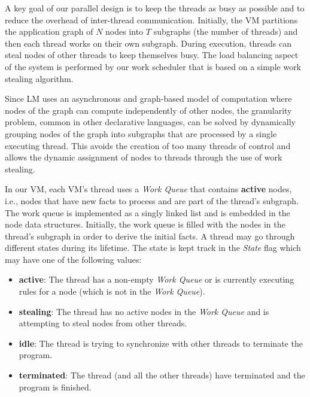 A key goal of our parallel design is to keep the threads as busy as possible and
to reduce the overhead of inter-thread communication. Initially, the VM
partitions the application graph of $N$ nodes into $T$ subgraphs (the number of
threads) and then each thread works on their own subgraph. During execution,
threads can steal nodes of other threads to keep themselves busy. The load
balancing aspect of the system is performed by our work scheduler that is based
on a simple work stealing algorithm.

Since LM uses an asynchronous and graph-based model of computation where nodes
of the graph can compute independently of other nodes, the granularity problem,
common in other declarative languages, can be solved by dynamically grouping
nodes of the graph into subgraphs that are processed by a single executing
thread. This avoids the creation of too many threads of control and allows the
dynamic assignment of nodes to threads through the use of work stealing.

In our VM, each VM's thread uses a \emph{Work Queue} that contains
\textbf{active} nodes, i.e., nodes that have new facts to process and are part
of the thread's subgraph. The work queue is implemented as a singly linked list
and is embedded in the node data structures. Initially, the work queue is filled
with the nodes in the thread's subgraph in order to derive the initial facts. A
thread may go through different states during its lifetime. The state is kept
track in the \emph{State} flag which may have one of the following values:

\begin{itemize}

   \item \textbf{active}: The thread has a non-empty \emph{Work Queue} or is
      currently executing rules for a node (which is not in the \emph{Work
      Queue}).

   \item \textbf{stealing}: The thread has no active nodes in the \emph{Work
      Queue} and is attempting to steal nodes from other
      threads.

   \item \textbf{idle}: The thread is trying to synchronize with other threads
      to terminate the program.
   
   \item \textbf{terminated}: The thread (and all the other threads) have
      terminated and the program is finished.

\end{itemize}

